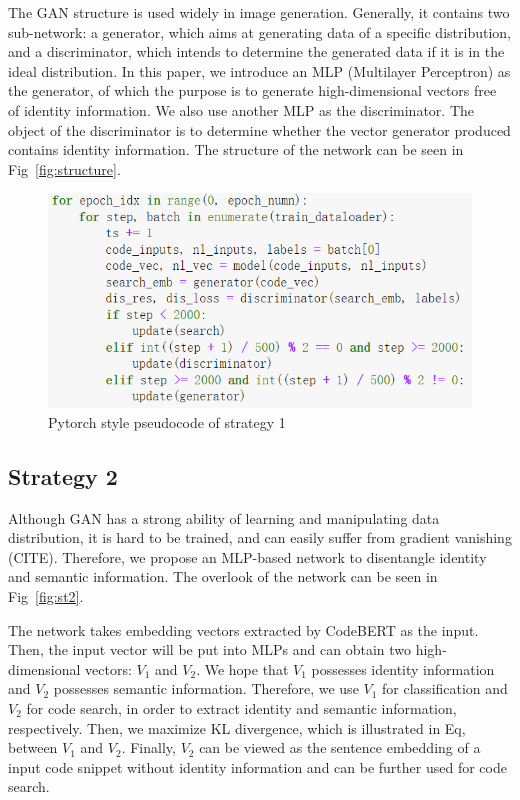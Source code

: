 The GAN structure is used widely in image generation. 
Generally, it contains two sub-network: a generator, 
which aims at generating data of a specific distribution, and a discriminator, 
which intends to determine the generated data if it is in the ideal distribution. 
In this paper, we introduce an MLP (Multilayer Perceptron) as the generator, 
of which the purpose is to generate high-dimensional vectors free of identity information. 
We also use another MLP as the discriminator. 
The object of the discriminator is to determine whether the vector generator produced 
contains identity information. The structure of the network can be seen in Fig~\ref{fig:structure}.

\begin{figure}[htb]
	\centering
	\includegraphics[width=1\linewidth]{imgs/gan_torch.png}
	\caption{Pytorch style pseudocode of strategy 1}
	\label{fig:gan}
\end{figure}

\subsection{Strategy 2}
Although GAN has a strong ability of learning and manipulating data distribution, 
it is hard to be trained, and can easily suffer from gradient vanishing (CITE). 
Therefore, we propose an MLP-based network to disentangle identity and semantic 
information. The overlook of the network can be seen in Fig~\ref{fig:st2}. 

The network takes embedding vectors extracted by CodeBERT as the input. 
Then, the input vector will be put into MLPs and can obtain 
two high-dimensional vectors: $V_1$ and $V_2$. 
We hope that $V_1$ possesses identity information and $V_2$  
possesses semantic information. Therefore, 
we use $V_1$ for classification and $V_2$ for code search, 
in order to extract identity and semantic information, respectively. 
Then, we maximize KL divergence, which is illustrated in Eq, between $V_1$ and $V_2$. 
Finally, $V_2$ can be viewed as the sentence embedding 
of a input code snippet without identity information and can be further 
used for code search.

